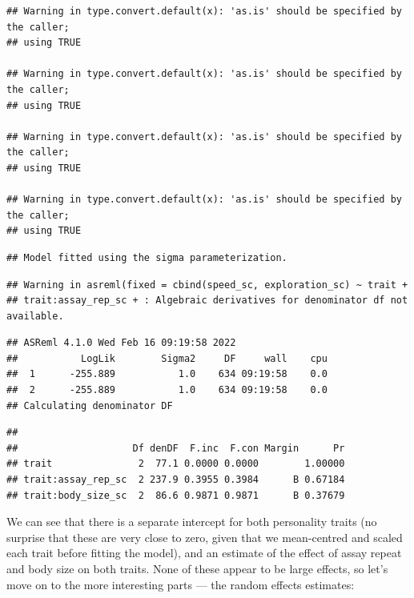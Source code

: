 \documentclass[
  12pt,
]{book}
\newenvironment{Shaded}{\begin{snugshade}}{\end{snugshade}}
\newcommand{\KeywordTok}[1]{\textcolor[rgb]{0.13,0.29,0.53}{\textbf{#1}}}
\newcommand{\NormalTok}[1]{#1}
\newcommand{\OperatorTok}[1]{\textcolor[rgb]{0.81,0.36,0.00}{\textbf{#1}}}
\begin{document}
\begin{verbatim}
## Warning in type.convert.default(x): 'as.is' should be specified by the caller;
## using TRUE

## Warning in type.convert.default(x): 'as.is' should be specified by the caller;
## using TRUE

## Warning in type.convert.default(x): 'as.is' should be specified by the caller;
## using TRUE

## Warning in type.convert.default(x): 'as.is' should be specified by the caller;
## using TRUE
\end{verbatim}

\begin{verbatim}
## Model fitted using the sigma parameterization.
\end{verbatim}

\begin{verbatim}
## Warning in asreml(fixed = cbind(speed_sc, exploration_sc) ~ trait +
## trait:assay_rep_sc + : Algebraic derivatives for denominator df not available.
\end{verbatim}

\begin{verbatim}
## ASReml 4.1.0 Wed Feb 16 09:19:58 2022
##           LogLik        Sigma2     DF     wall    cpu
##  1      -255.889           1.0    634 09:19:58    0.0
##  2      -255.889           1.0    634 09:19:58    0.0
## Calculating denominator DF
\end{verbatim}

\begin{verbatim}
## 
##                    Df denDF  F.inc  F.con Margin      Pr
## trait               2  77.1 0.0000 0.0000        1.00000
## trait:assay_rep_sc  2 237.9 0.3955 0.3984      B 0.67184
## trait:body_size_sc  2  86.6 0.9871 0.9871      B 0.37679
\end{verbatim}

We can see that there is a separate intercept for both personality traits (no surprise that these are very close to zero, given that we mean-centred and scaled each trait before fitting the model), and an estimate of the effect of assay repeat and body size on both traits. None of these appear to be large effects, so let's move on to the more interesting parts --- the random effects estimates:

\begin{Shaded}
\end{Shaded}
\end{document}

